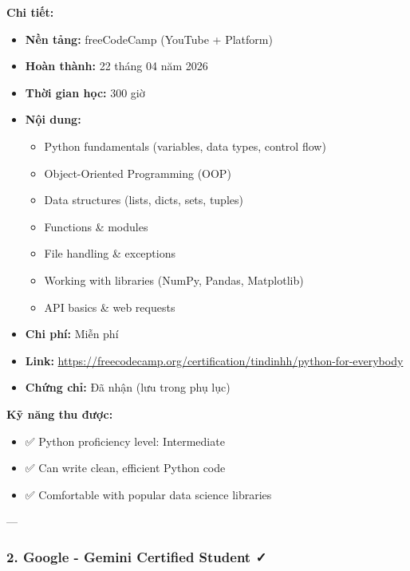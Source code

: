 \documentclass[12pt,a4paper]{article}
\begin{document}
\textbf{Chi tiết:}
\begin{itemize}
    \item \textbf{Nền tảng:} freeCodeCamp (YouTube + Platform)
    \item \textbf{Hoàn thành:} 22 tháng 04 năm 2026
    \item \textbf{Thời gian học:} 300 giờ
    \item \textbf{Nội dung:} 
    \begin{itemize}
        \item Python fundamentals (variables, data types, control flow)
        \item Object-Oriented Programming (OOP)
        \item Data structures (lists, dicts, sets, tuples)
        \item Functions \& modules
        \item File handling \& exceptions
        \item Working with libraries (NumPy, Pandas, Matplotlib)
        \item API basics \& web requests
    \end{itemize}
    \item \textbf{Chi phí:} Miễn phí
    \item \textbf{Link:} \url{https://freecodecamp.org/certification/tindinhh/python-for-everybody}
    \item \textbf{Chứng chỉ:} Đã nhận (lưu trong phụ lục)
\end{itemize}

\textbf{Kỹ năng thu được:}
\begin{itemize}
    \item ✅ Python proficiency level: Intermediate
    \item ✅ Can write clean, efficient Python code
    \item ✅ Comfortable with popular data science libraries
\end{itemize}

---

\subsubsection{2. Google - Gemini Certified Student ✓}
\end{document}
